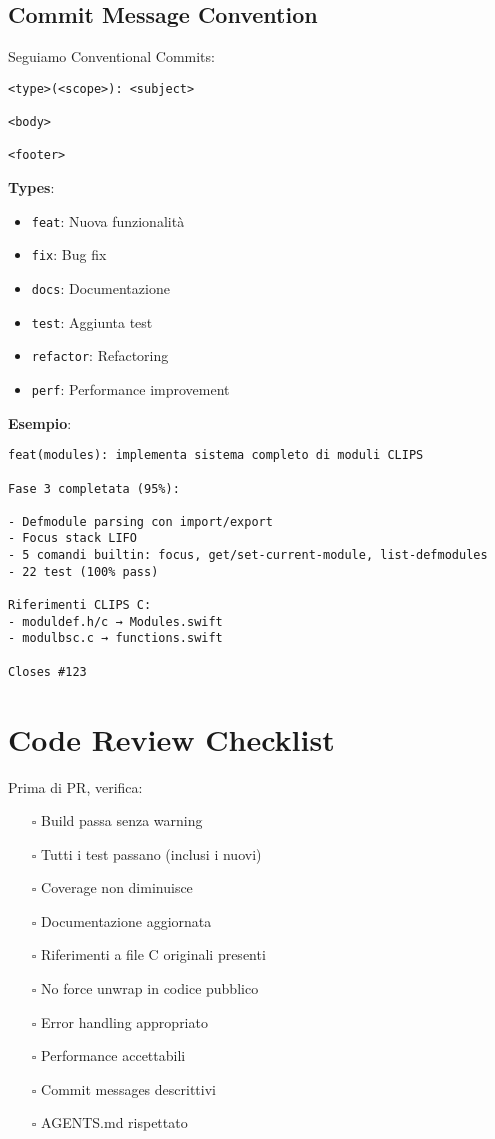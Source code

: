 \subsection{Commit Message Convention}

Seguiamo Conventional Commits:

\begin{verbatim}
<type>(<scope>): <subject>

<body>

<footer>
\end{verbatim}

\textbf{Types}:
\begin{itemize}
\item \texttt{feat}: Nuova funzionalità
\item \texttt{fix}: Bug fix
\item \texttt{docs}: Documentazione
\item \texttt{test}: Aggiunta test
\item \texttt{refactor}: Refactoring
\item \texttt{perf}: Performance improvement
\end{itemize}

\textbf{Esempio}:
\begin{verbatim}
feat(modules): implementa sistema completo di moduli CLIPS

Fase 3 completata (95%):

- Defmodule parsing con import/export
- Focus stack LIFO
- 5 comandi builtin: focus, get/set-current-module, list-defmodules
- 22 test (100% pass)

Riferimenti CLIPS C:
- moduldef.h/c → Modules.swift
- modulbsc.c → functions.swift

Closes #123
\end{verbatim}

\section{Code Review Checklist}

Prima di PR, verifica:

\begin{itemize}
\item[$\square$] Build passa senza warning
\item[$\square$] Tutti i test passano (inclusi i nuovi)
\item[$\square$] Coverage non diminuisce
\item[$\square$] Documentazione aggiornata
\item[$\square$] Riferimenti a file C originali presenti
\item[$\square$] No force unwrap in codice pubblico
\item[$\square$] Error handling appropriato
\item[$\square$] Performance accettabili
\item[$\square$] Commit messages descrittivi
\item[$\square$] AGENTS.md rispettato
\end{itemize}

